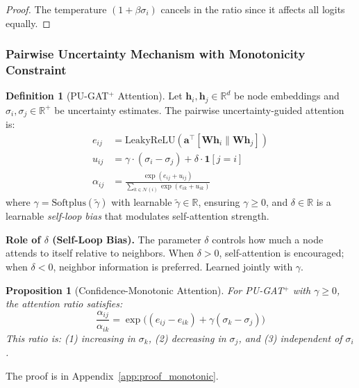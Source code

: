 \documentclass{article}
\theoremstyle{plain}
\newtheorem{proposition}[theorem]{Proposition}
\theoremstyle{definition}
\newtheorem{definition}[theorem]{Definition}
\theoremstyle{remark}
\begin{document}
\begin{proof}
The temperature $(1 + \beta\sigma_i)$ cancels in the ratio since it affects all logits equally.
\end{proof}

\subsubsection{Pairwise Uncertainty Mechanism with Monotonicity Constraint}

\begin{definition}[PU-GAT$^+$ Attention]
\label{def:pugat}
Let $\mathbf{h}_i, \mathbf{h}_j \in \mathbb{R}^d$ be node embeddings and $\sigma_i, \sigma_j \in \mathbb{R}^+$ be uncertainty estimates. The pairwise uncertainty-guided attention is:
\begin{align}
e_{ij} &= \text{LeakyReLU}(\mathbf{a}^\top [\mathbf{W}\mathbf{h}_i \| \mathbf{W}\mathbf{h}_j]) \label{eq:base_attn}\\
u_{ij} &= \gamma \cdot (\sigma_i - \sigma_j) + \delta \cdot \mathbf{1}[j = i] \label{eq:pairwise_term}\\
\alpha_{ij} &= \frac{\exp(e_{ij} + u_{ij})}{\sum_{k \in \mathcal{N}(i)} \exp(e_{ik} + u_{ik})} \label{eq:final_attn}
\end{align}
where $\gamma = \text{Softplus}(\tilde{\gamma})$ with learnable $\tilde{\gamma} \in \mathbb{R}$, ensuring $\gamma \geq 0$, and $\delta \in \mathbb{R}$ is a learnable \emph{self-loop bias} that modulates self-attention strength.
\end{definition}

\textbf{Role of $\delta$ (Self-Loop Bias).} The parameter $\delta$ controls how much a node attends to itself relative to neighbors. When $\delta > 0$, self-attention is encouraged; when $\delta < 0$, neighbor information is preferred. Learned jointly with $\gamma$.

\begin{proposition}[Confidence-Monotonic Attention]
\label{prop:confidence_monotonic}
For PU-GAT$^+$ with $\gamma \geq 0$, the attention ratio satisfies:
\begin{equation}
\frac{\alpha_{ij}}{\alpha_{ik}} = \exp\big((e_{ij} - e_{ik}) + \gamma(\sigma_k - \sigma_j)\big)
\label{eq:ratio}
\end{equation}
This ratio is: (1) increasing in $\sigma_k$, (2) decreasing in $\sigma_j$, and (3) independent of $\sigma_i$.
\end{proposition}

The proof is in Appendix~\ref{app:proof_monotonic}.
\end{document}
